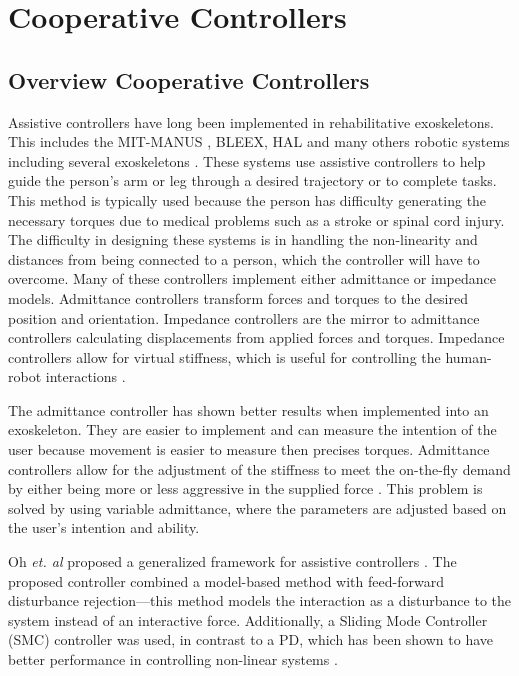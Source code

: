 \section{Cooperative Controllers}


\subsection{Overview Cooperative Controllers}
Assistive controllers have long been implemented in rehabilitative exoskeletons. This includes the MIT-MANUS \cite{ju2005rehabilitation}, BLEEX\cite{kazerooni2006hybrid}, HAL\cite{kawamoto2004power} and many others robotic systems including several exoskeletons \cite{kim2012admittance,ott2010unified,huo2011control}. These systems use assistive controllers to help guide the person's arm or leg through a desired trajectory or to complete tasks. This method is typically used because the person has difficulty generating the necessary torques due to medical problems such as a stroke or spinal cord injury. The difficulty in designing these systems is in handling the non-linearity and distances from being connected to a person, which the controller will have to overcome. Many of these controllers implement either admittance or impedance models. Admittance controllers transform forces and torques to the desired position and orientation. Impedance controllers are the mirror to admittance controllers calculating displacements from applied forces and torques. Impedance controllers allow for virtual stiffness, which is useful for controlling the human-robot interactions \cite{keemink2018admittance}. 

The admittance controller has shown better results when implemented into an exoskeleton. They are easier to implement and can measure the intention of the user because movement is easier to measure then precises torques. Admittance controllers allow for the adjustment of the stiffness to meet the on-the-fly demand by either being more or less aggressive in the supplied force \cite{aguirre2007active,newman1994stable}. This problem is solved by using variable admittance, where the parameters are adjusted based on the user's intention and ability.

Oh \textit{et. al} proposed a generalized framework for assistive controllers \cite{oh2015generalized}. The proposed controller combined a model-based method with feed-forward disturbance rejection—this method models the interaction as a disturbance to the system instead of an interactive force.  Additionally, a Sliding Mode Controller (SMC) controller was used, in contrast to a PD, which has been shown to have better performance in controlling non-linear systems \cite{slotine1991applied}.


